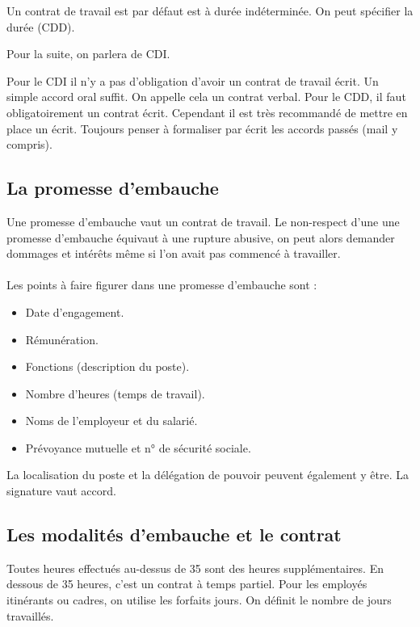 Un contrat de travail est par défaut est à durée indéterminée.
On peut spécifier la durée (CDD).

Pour la suite, on parlera de CDI.

Pour le CDI il n’y a pas d’obligation d’avoir un contrat de travail écrit.
Un simple accord oral suffit.
On appelle cela un contrat verbal.
Pour le CDD, il faut obligatoirement un contrat écrit.
Cependant il est très recommandé de mettre en place un écrit.
Toujours penser à formaliser par écrit les accords passés (mail y compris).


\subsection{La promesse d'embauche}
	Une promesse d’embauche vaut un contrat de travail.
	Le non-respect d’une une promesse d’embauche équivaut à une rupture abusive, on peut alors demander dommages et intérêts même si l'on avait pas commencé à travailler.


	\paragraph{}
	Les points à faire figurer dans une promesse d’embauche sont :
	\begin{itemize}
		\item[\textbullet] Date d’engagement.
		\item[\textbullet] Rémunération.
		\item[\textbullet] Fonctions (description du poste).
		\item[\textbullet] Nombre d’heures (temps de travail).
		\item[\textbullet] Noms de l'employeur et du salarié.
		\item[\textbullet] Prévoyance mutuelle et n° de sécurité sociale.
	\end{itemize}

	La localisation du poste et la délégation de pouvoir peuvent également y être.
	La signature vaut accord.

\subsection{Les modalités d'embauche et le contrat}
	Toutes heures effectués au-dessus de 35 sont des heures supplémentaires.
	En dessous de 35 heures, c’est un contrat à temps partiel.
	Pour les employés itinérants ou cadres, on utilise les forfaits jours.
	On définit le nombre de jours travaillés.

